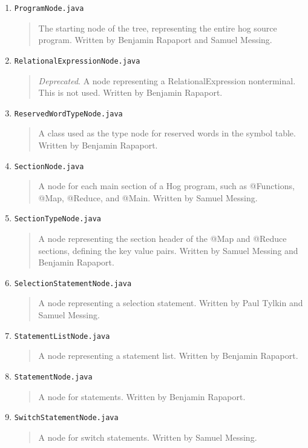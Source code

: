 \documentclass{report}
\begin{document}
\begin{itemize}
\begin{enumerate}
\item \texttt{ProgramNode.java}
\begin{quotation}
\noindent The starting node of the tree, representing the entire hog source program. Written by Benjamin Rapaport and Samuel Messing.
\end{quotation}
\item \texttt{RelationalExpressionNode.java}
\begin{quotation}
\noindent  \emph{Deprecated}. A node representing a RelationalExpression nonterminal. This is not used. Written by Benjamin Rapaport.
\end{quotation}
\item \texttt{ReservedWordTypeNode.java}
\begin{quotation}
\noindent A class used as the type node for reserved words in the symbol table. Written by Benjamin Rapaport.
\end{quotation}
\item \texttt{SectionNode.java}
\begin{quotation}
\noindent A node for each main section of a Hog program, such as @Functions, @Map, @Reduce, and @Main. Written by Samuel Messing.
\end{quotation}
\item \texttt{SectionTypeNode.java}
\begin{quotation}
\noindent A node representing the section header of the @Map and @Reduce sections, defining the key value pairs. Written by Samuel Messing and Benjamin Rapaport.
\end{quotation}
\item \texttt{SelectionStatementNode.java}
\begin{quotation}
\noindent A node representing a selection statement. Written by Paul Tylkin and Samuel Messing.
\end{quotation}
\item \texttt{StatementListNode.java}
\begin{quotation}
\noindent A node representing a statement list. Written by Benjamin Rapaport.
\end{quotation}
\item \texttt{StatementNode.java}
\begin{quotation}
\noindent A node for statements. Written by Benjamin Rapaport.
\end{quotation}
\item \texttt{SwitchStatementNode.java}
\begin{quotation}
\noindent A node for switch statements. Written by Samuel Messing.

\end{quotation}
\end{enumerate}
\end{itemize}
\end{document}
